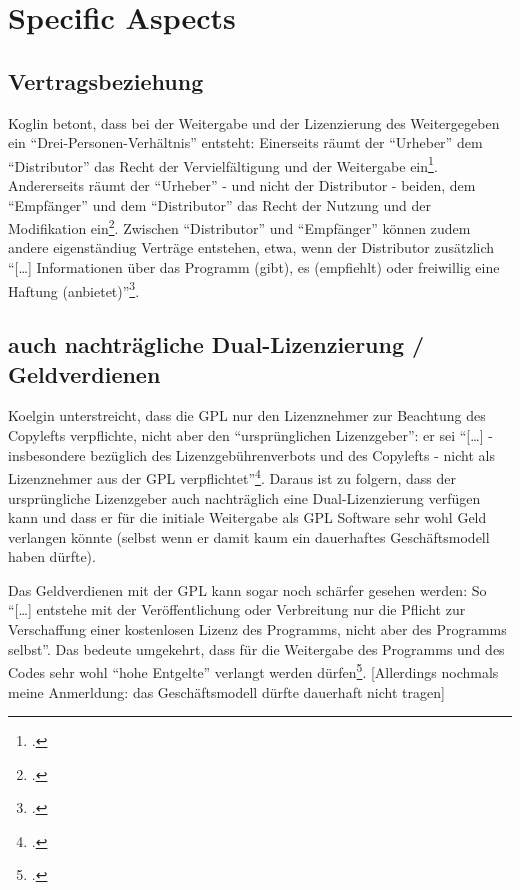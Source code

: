 \documentclass[DIV=calc,BCOR=5mm,11pt,headings=small,oneside,abstract=true, toc=bib]{scrartcl}
\begin{document}
\section{Specific Aspects}

\subsection{Vertragsbeziehung}

Koglin betont, dass bei der Weitergabe und der Lizenzierung des Weitergegeben
ein \enquote{Drei-Personen-Verhältnis} entsteht: Einerseits räumt der
\enquote{Urheber} dem \enquote{Distributor} das Recht der
Vervielfältigung und der Weitergabe ein\footcite[vgl.][32]{Koglin2007a}.
Andererseits räumt der \enquote{Urheber} - und nicht der Distributor -
beiden, dem \enquote{Empfänger} und dem \enquote{Distributor} das Recht
der Nutzung und der Modifikation ein\footcite[vgl.][33]{Koglin2007a}. Zwischen
\enquote{Distributor} und \enquote{Empfänger} können zudem andere
eigenständiug Verträge entstehen, etwa, wenn der Distributor zusätzlich
\enquote{[\ldots] Informationen über das Programm (gibt), es (empfiehlt) oder
freiwillig eine Haftung (anbietet)}\footcite[vgl.][32]{Koglin2007a}.

\subsection{auch nachträgliche Dual-Lizenzierung / Geldverdienen}

Koelgin unterstreicht, dass die GPL nur den Lizenznehmer zur
Beachtung des Copylefts verpflichte, nicht aber den \enquote{ursprünglichen
Lizenzgeber}: er sei \enquote{[\ldots] - insbesondere bezüglich des
Lizenzgebührenverbots und des Copylefts - nicht als Lizenznehmer aus der
GPL verpflichtet}\footcite[vgl.][185f]{Koglin2007a}. Daraus ist zu
folgern, dass der ursprüngliche Lizenzgeber auch nachträglich eine Dual-Lizenzierung
verfügen kann und dass er für die initiale Weitergabe als GPL Software sehr wohl
Geld verlangen könnte (selbst wenn er damit kaum ein dauerhaftes
Geschäftsmodell haben dürfte).

Das Geldverdienen mit der GPL kann sogar noch schärfer gesehen werden: So
\enquote{[\ldots] entstehe mit der Veröffentlichung oder Verbreitung nur
die Pflicht zur Verschaffung einer kostenlosen Lizenz des Programms,
nicht aber des Programms selbst}. Das bedeute umgekehrt, dass für die
Weitergabe des Programms und des Codes sehr wohl \enquote{hohe Entgelte}
verlangt werden dürfen\footcite[vgl.][213]{Koglin2007a}. [Allerdings nochmals
meine Anmerldung: das Geschäftsmodell dürfte dauerhaft nicht tragen]
\end{document}
